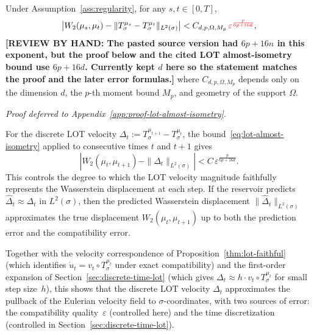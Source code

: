 \documentclass[11pt]{article}
\newcommand{\chg}[1]{{\color{red}#1}}
\newcommand{\review}[1]{{\color{red}\textbf{[REVIEW BY HAND: #1]}}}
\newcommand{\1}{\mathbf{1}}
\begin{document}
\begin{proposition}\label{prop:lot-almost-isometry}
Under Assumption~\ref{ass:regularity}, for any $s, t \in [0,T]$,
\begin{equation}\label{eq:lot-almost-isometry}
  \left| W_2(\mu_s, \mu_t)
       - \|T_\sigma^{\mu_s} - T_\sigma^{\mu_t}\|_{L^2(\sigma)} \right|
  < C_{d,p,\Omega,M_p} \, \chg{\varepsilon^{\frac{p}{6p+16d}}},
\end{equation}
\review{The pasted source version had $6p+16n$ in this exponent, but the proof below and the cited LOT almost-isometry bound use $6p+16d$. Currently kept $d$ here so the statement matches the proof and the later error formulas.}
where $C_{d,p,\Omega,M_p}$ depends only on the dimension $d$, the $p$-th moment bound $M_p$, and geometry of the support $\Omega$. 
\end{proposition}
\noindent\emph{Proof deferred to Appendix~\ref{app:proof-lot-almost-isometry}.}

\begin{remark}\label{rmk:lot-vel-faithful}
For the discrete LOT velocity
$\Delta_t := T_\sigma^{\mu_{t+1}} - T_\sigma^{\mu_t}$, the
bound~\eqref{eq:lot-almost-isometry} applied to consecutive times $t$ and $t+1$ gives
\begin{equation}\label{eq:lot-vel-faithful}
  \left| W_2(\mu_t, \mu_{t+1})
       - \|\Delta_t\|_{L^2(\sigma)} \right|
  < C \, \varepsilon^{\frac{p}{6p + 16d}}.
\end{equation}
This controls the degree to which the LOT velocity magnitude faithfully represents the Wasserstein displacement at each step. If the reservoir predicts $\widehat{\Delta}_t \approx \Delta_t$ in $L^2(\sigma)$, then the predicted Wasserstein displacement $\|\widehat{\Delta}_t\|_{L^2(\sigma)}$ approximates the true displacement $W_2(\mu_t, \mu_{t+1})$ up to both the prediction error and the compatibility error.

Together with the velocity correspondence of Proposition~\ref{thm:lot-faithful} (which identifies $\dot{u}_t = v_t \circ T_\sigma^{\mu_t}$ under exact compatibility) and the first-order expansion of
Section~\ref{sec:discrete-time-lot} (which gives
$\Delta_t \approx h \cdot v_t \circ T_\sigma^{\mu_t}$ for small step
size~$h$), this shows that the discrete LOT velocity $\Delta_t$
approximates the pullback of the Eulerian velocity field to
$\sigma$-coordinates, with two sources of error: the compatibility
quality~$\varepsilon$ (controlled here) and the time discretization
(controlled in Section~\ref{sec:discrete-time-lot}).
\end{remark}
\end{document}
